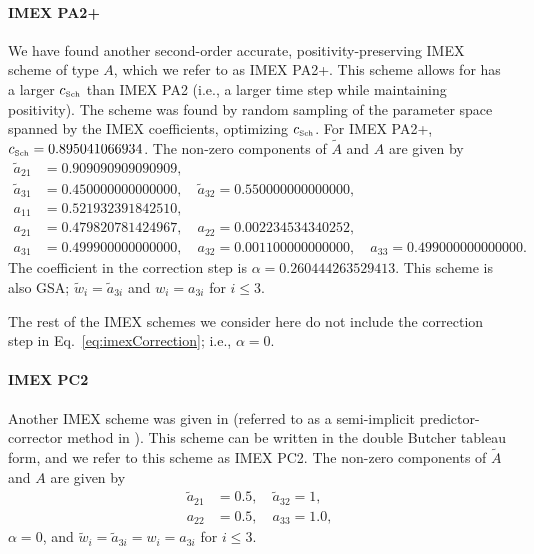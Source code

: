 \paragraph{IMEX PA2+}

We have found another second-order accurate, positivity-preserving IMEX scheme of type $A$, which we refer to as IMEX PA2+.  
This scheme allows for has a larger $c_{\mbox{\tiny Sch}}$ than IMEX PA2 (i.e., a larger time step while maintaining positivity).  
The scheme was found by random sampling of the parameter space spanned by the IMEX coefficients, optimizing $c_{\mbox{\tiny Sch}}$.  
For IMEX PA2+, $c_{\mbox{\tiny Sch}} = 0.895041066934$. 
The non-zero components of $\tilde{A}$ and $A$ are given by
\begin{align*}
  \tilde{a}_{21} &= 0.909090909090909, \\
  \tilde{a}_{31} &= 0.450000000000000, \quad \tilde{a}_{32} = 0.550000000000000, \\
  a_{11} &= 0.521932391842510, \\
  a_{21} &= 0.479820781424967, \quad a_{22} = 0.002234534340252, \\
  a_{31} &= 0.499900000000000, \quad a_{32} = 0.001100000000000, \quad a_{33} = 0.499000000000000.
\end{align*}
The coefficient in the correction step is $\alpha = 0.260444263529413$.  
This scheme is also GSA; $\tilde{w}_{i}=\tilde{a}_{3i}$ and $w_{i}=a_{3i}$ for $i\le3$.  

The rest of the IMEX schemes we consider here do not include the correction step in Eq.~\eqref{eq:imexCorrection}; i.e., $\alpha=0$.  

\paragraph{IMEX PC2}

Another IMEX scheme was given in \cite{mcclarren_etal_2008} (referred to as a semi-implicit predictor-corrector method in \cite{mcclarren_etal_2008}).  
This scheme can be written in the double Butcher tableau form, and we refer to this scheme as IMEX PC2.  
The non-zero components of $\tilde{A}$ and $A$ are given by
\begin{align*}
  \tilde{a}_{21} &= 0.5, \quad \tilde{a}_{32} = 1, \\
  a_{22} &= 0.5, \quad a_{33} = 1.0,
\end{align*}
$\alpha=0$, and $\tilde{w}_{i}=\tilde{a}_{3i} = w_{i}=a_{3i}$ for $i\le3$.

